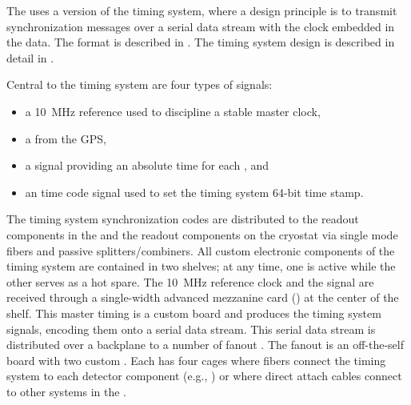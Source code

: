 The   uses a version of the  timing
system, where a design principle is to transmit synchronization messages over
a serial data stream with the clock embedded in the data. The format
is described in . The timing system design is
described in detail in .

Central to the timing system are four types of signals:
\begin{itemize}
\item a \SI{10}{\mega\hertz} reference used to discipline a stable master clock,
\item a  from the GPS,
\item a  signal providing an absolute time for each , and
\item an  time code signal
  used to set the timing system 64-bit time stamp.
\end{itemize}

The timing system synchronization codes are distributed to the  readout components in the  and the readout components on the cryostat via single mode fibers and passive splitters/combiners.
All custom electronic components of the timing system are contained in two  shelves; at any time, one is active while the other serves as a hot spare.
The \SI{10}{MHz} reference clock and the  signal are received through a single-width advanced mezzanine card () at the center of the  shelf.
This master timing  is a custom board and produces the timing system signals, encoding them onto a serial data stream.
This serial data stream is distributed over a backplane to a number of fanout .
The fanout  is an off-the-self board with two custom .
Each  has four  cages where fibers connect the timing system to each detector component (e.g., ) or where direct attach cables connect to other systems in the .

